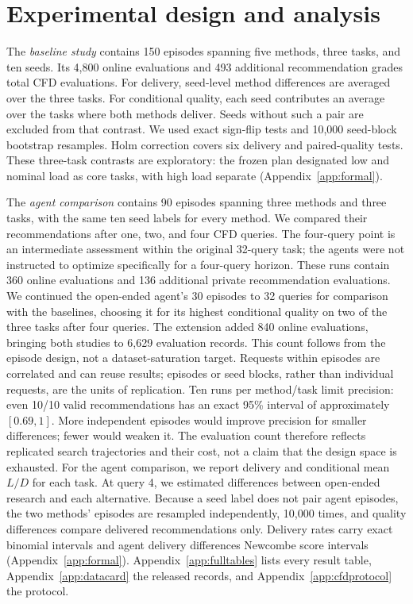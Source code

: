 \documentclass{article} %
\newcommand{\UnifiedCFDObserved}{6{,}629}
\begin{document}
\section{Experimental design and analysis}
\label{sec:analysis}

The \emph{baseline study} contains 150 episodes spanning five methods, three
tasks, and ten seeds. Its 4{,}800 online evaluations and 493 additional recommendation
grades total \TotalCFDEvaluations{} CFD evaluations. For delivery, seed-level method differences are
averaged over the three tasks. For conditional quality, each seed contributes
an average over the tasks where both methods deliver. Seeds without such a
pair are excluded from that contrast. We used exact sign-flip tests and
10{,}000 seed-block bootstrap resamples. Holm correction covers six delivery and
paired-quality tests. These three-task contrasts are exploratory: the frozen
plan designated low and nominal load as core tasks, with high load separate
(Appendix~\ref{app:formal}).

The \emph{agent comparison} contains 90 episodes spanning three methods and
three tasks, with the same ten seed labels for every method. We compared their
recommendations after one, two, and four CFD queries. The four-query point
is an intermediate assessment within the original 32-query task; the agents
were not instructed to optimize specifically for a four-query horizon.
These runs contain
360 online evaluations and 136 additional private recommendation evaluations.
We continued the open-ended agent's 30 episodes to 32 queries for comparison
with the baselines, choosing it for its highest conditional quality on two of the three tasks after four queries.
The extension added 840 online evaluations, bringing both studies to \UnifiedCFDObserved{} evaluation records.
This count follows from the episode design, not a dataset-saturation target.
Requests within episodes are correlated and can reuse results; episodes or
seed blocks, rather than individual requests, are the units of replication.
Ten runs per method/task limit precision: even 10/10 valid recommendations
has an exact 95\% interval of approximately $[0.69,1]$. More independent
episodes would improve precision for smaller differences; fewer would
weaken it. The evaluation count therefore reflects replicated search
trajectories and their cost, not a claim that the design space is exhausted.
For the agent comparison, we report delivery and conditional mean $L/D$ for
each task. At query 4, we estimated differences between open-ended research and
each alternative. Because a seed label does not pair agent episodes, the two
methods' episodes are resampled independently, 10{,}000 times, and quality
differences compare delivered recommendations only. Delivery rates carry
exact binomial intervals and agent delivery differences Newcombe score
intervals (Appendix~\ref{app:formal}). Appendix~\ref{app:fulltables}
lists every result table, Appendix~\ref{app:datacard} the released records, and
Appendix~\ref{app:cfdprotocol} the protocol.
\end{document}
